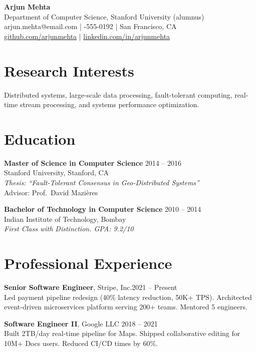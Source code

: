 \documentclass[11pt,letterpaper]{article}
\begin{document}
\begin{center}
{\Large\bfseries Arjun Mehta}\\[6pt]
{\normalsize Department of Computer Science, Stanford University (alumnus)}\\[3pt]
{\small arjun.mehta@email.com \quad | -555-0192 \quad | \quad San Francisco, CA}\\[2pt]
{\small \url{github.com/arjunmehta} \quad | \quad \url{linkedin.com/in/arjunmehta}}
\end{center}

\section{Research Interests}
Distributed systems, large-scale data processing, fault-tolerant computing, real-time stream processing, and systems performance optimization.

\section{Education}

\noindent\textbf{Master of Science in Computer Science} \hfill 2014 -- 2016\\
Stanford University, Stanford, CA\\
{\small\itshape Thesis: ``Fault-Tolerant Consensus in Geo-Distributed Systems''}\\
{\small Advisor: Prof.\ David Mazi\`eres}

\vspace{6pt}
\noindent\textbf{Bachelor of Technology in Computer Science} \hfill 2010 -- 2014\\
Indian Institute of Technology, Bombay\\
{\small\itshape First Class with Distinction. GPA: 9.2/10}

\section{Professional Experience}

\noindent\textbf{Senior Software Engineer}, Stripe, Inc.\hfill 2021 -- Present\footnotemark[1]\\
{\small Led payment pipeline redesign (40\% latency reduction, 50K+ TPS). Architected event-driven microservices platform serving 200+ teams. Mentored 5 engineers.}

\vspace{6pt}
\noindent\textbf{Software Engineer II}, Google LLC \hfill 2018 -- 2021\\
{\small Built 2TB/day real-time pipeline for Maps. Shipped collaborative editing for 10M+ Docs users. Reduced CI/CD times by 60\%.}
\end{document}
